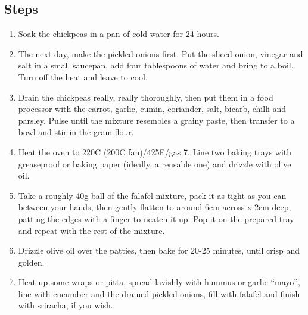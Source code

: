 \documentclass{book}
\begin{document}
\subsection*{Steps}
\begin{enumerate}
\item Soak the chickpeas in a pan of cold water for 24 hours. 
\item The next day, make the pickled onions first. Put the sliced onion, vinegar and salt in a small saucepan, add four tablespoons of water and bring to a boil. Turn off the heat and leave to cool.
\item Drain the chickpeas really, really thoroughly, then put them in a food processor with the carrot, garlic, cumin, coriander, salt, bicarb, chilli and parsley. Pulse until the mixture resembles a grainy paste, then transfer to a bowl and stir in the gram flour.
\item Heat the oven to 220C (200C fan)/425F/gas 7. Line two baking trays with greaseproof or baking paper (ideally, a reusable one) and drizzle with olive oil.
\item Take a roughly 40g ball of the falafel mixture, pack it as tight as you can between your hands, then gently flatten to around 6cm across x 2cm deep, patting the edges with a finger to neaten it up. Pop it on the prepared tray and repeat with the rest of the mixture.
\item Drizzle olive oil over the patties, then bake for 20-25 minutes, until crisp and golden.
\item Heat up some wraps or pitta, spread lavishly with hummus or garlic “mayo”, line with cucumber and the drained pickled onions, fill with falafel and finish with sriracha, if you wish.
\end{enumerate}
\newpage
\end{document}
